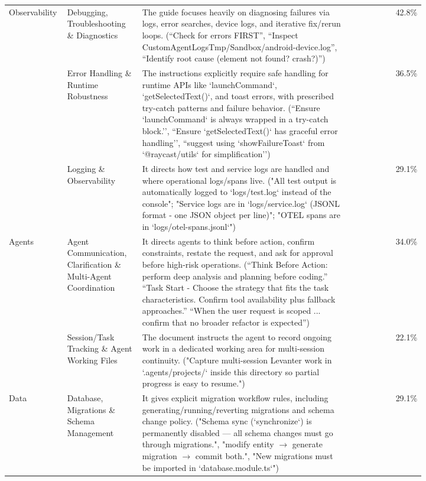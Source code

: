{\begin{longtable}{|p{0.14\linewidth}|p{0.18\linewidth}|p{0.5\linewidth}|r|}
\hline
\multirow{3}{=}{\centering Observability} & Debugging, Troubleshooting \& Diagnostics & The guide focuses heavily on diagnosing failures via logs, error searches, device logs, and iterative fix/rerun loops. (``Check for errors FIRST'', ``Inspect CustomAgentLogsTmp/Sandbox/android-device.log'', ``Identify root cause (element not found? crash?)'') & 42.8\% \\
\hhline{~||-|-|-|}
 & Error Handling \& Runtime Robustness & The instructions explicitly require safe handling for runtime APIs like `launchCommand`, `getSelectedText()`, and toast errors, with prescribed try-catch patterns and failure behavior. (``Ensure `launchCommand` is always wrapped in a try-catch block.'', ``Ensure `getSelectedText()` has graceful error handling'', ``suggest using `showFailureToast` from `@raycast/utils` for simplification'') & 36.5\% \\
\hhline{~||-|-|-|}
 & Logging \& Observability & It directs how test and service logs are handled and where operational logs/spans live. ("All test output is automatically logged to `logs/test.log` instead of the console"; "Service logs are in `logs/service.log` (JSONL format - one JSON object per line)"; "OTEL spans are in `logs/otel-spans.jsonl`") & 29.1\% \\
\hline
\multirow{2}{=}{\centering Agents} & Agent Communication, Clarification \& Multi-Agent Coordination & It directs agents to think before action, confirm constraints, restate the request, and ask for approval before high-risk operations. (``Think Before Action: perform deep analysis and planning before coding.'' ``Task Start - Choose the strategy that fits the task characteristics. Confirm tool availability plus fallback approaches.'' ``When the user request is scoped ... confirm that no broader refactor is expected'') & 34.0\% \\
\hhline{~||-|-|-|}
 & Session/Task Tracking \& Agent Working Files & The document instructs the agent to record ongoing work in a dedicated working area for multi-session continuity. ("Capture multi-session Levanter work in `.agents/projects/` inside this directory so partial progress is easy to resume.") & 22.1\% \\
\hline
\multirow{2}{=}{\centering Data} & Database, Migrations \& Schema Management & It gives explicit migration workflow rules, including generating/running/reverting migrations and schema change policy. ("Schema sync (`synchronize`) is permanently disabled — all schema changes must go through migrations.", "modify entity $\rightarrow$ generate migration $\rightarrow$ commit both.", "New migrations must be imported in `database.module.ts`") & 29.1\% \\

\end{longtable}}
